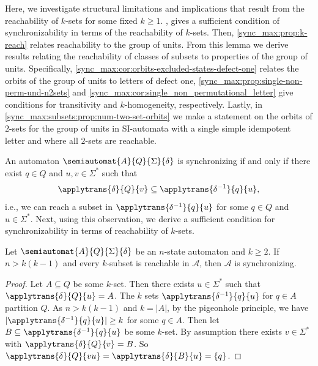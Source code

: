 
Here, we investigate structural limitations and implications that result from
the reachability of $k$-sets for some fixed $k \ge 1$. ,
gives a sufficient condition of synchronizability in terms of the reachability of $k$-sets.
Then, \cref{sync_max:prop:k-reach} 
relates reachability 
to the group of units.
From this lemma we derive results relating
the reachability of classes of subsets to 
properties of the group of units.
Specifically, \cref{sync_max:cor:orbits-excluded-states-defect-one}
relates the orbits of the group of units to letters of defect one,
\cref{sync_max:prop:single-non-perm-und-n2sets} and \cref{sync_max:cor:single_non_permutational_letter}
give conditions for transitivity and $k$-homogeneity, respectively.
Lastly, in \cref{sync_max:subsets:prop:num-two-set-orbits}
we make a statement on the orbits of $2$-sets for the group of units
in SI-automata with a single simple idempotent letter and where all $2$-sets are reachable.

An automaton $\semiautomat{A}{Q}{\Sigma}{\delta}$ 
is synchronizing if and only if there exist $q \in Q$ 
and $u,v \in \Sigma^*$ such that
\[
\applytrans{\delta}{Q}{v} \subseteq \applytrans{\delta^{-1}}{q}{u},
\]
i.e., we can reach a subset in $\applytrans{\delta^{-1}}{q}{u}$
for some $q \in Q$ and $u \in \Sigma^*$.
Next, using this observation, we derive a sufficient condition for synchronizability
in terms of reachability of $k$-sets.

\begin{proposition}
	\label{sync_max:prop:reachability-k-sets-sync}
	Let $\semiautomat{A}{Q}{\Sigma}{\delta}$ be an $n$-state automaton
	and $k \ge 2$. If $n > k(k-1)$ and every $k$-subset
	is reachable in $\mathcal A$, then $\mathcal A$ is synchronizing.
\end{proposition}
\begin{proof}
	Let $A \subseteq Q$ be some $k$-set.
	Then there exists $u \in \Sigma^*$
	such that $\applytrans{\delta}{Q}{u} = A$.
	The $k$ sets $\applytrans{\delta^{-1}}{q}{u}$
	for $q \in A$ partition $Q$.
	As $n > k(k-1)$ and $k = |A|$, by the pigeonhole principle,
	we have $|\applytrans{\delta^{-1}}{q}{u}| \ge k$ for some $q \in A$.
	Then let $B \subseteq \applytrans{\delta^{-1}}{q}{u}$
	be some $k$-set.
	By assumption there exists $v \in \Sigma^*$ 
	with $\applytrans{\delta}{Q}{v} = B$. So $\applytrans{\delta}{Q}{vu} = \applytrans{\delta}{B}{u} = \{q\}$.	
\end{proof}

